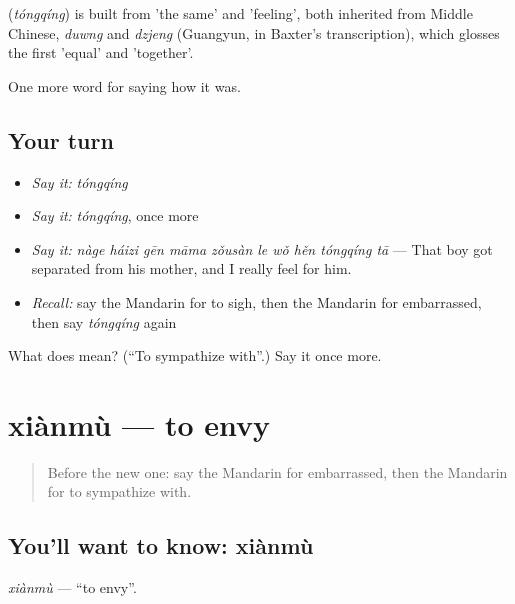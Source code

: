 \begin{cousinweb}
\textbf{} (\emph{tóngqíng}) is built from  'the same' and  'feeling', both inherited from Middle Chinese, \emph{duwng} and \emph{dzjeng} (Guangyun, in Baxter's transcription), which glosses the first 'equal' and 'together'.
\end{cousinweb}

\begin{grammarlens}[title={What you've built}]
One more word for saying how it was.
\end{grammarlens}

\subsection*{Your turn}
\begin{itemize}
\raggedright
  \item \emph{Say it:} \emph{tóngqíng}
  \item \emph{Say it:} \emph{tóngqíng}, once more
  \item \emph{Say it:} \emph{nàge háizi gēn māma zǒusàn le wǒ hěn tóngqíng tā} — That boy got separated from his mother, and I really feel for him.
  \item \emph{Recall:} say the Mandarin for to sigh, then the Mandarin for embarrassed, then say \emph{tóngqíng} again
\end{itemize}

\begin{tcolorbox}[breakable,colback=teal!4,colframe=teal!35!black,title={Before you move on}]
What does  mean? (\textquotedblleft{}To sympathize with\textquotedblright{}.) Say it once more.
\end{tcolorbox}
\section[xiànmù]{xiànmù — to envy}

\label{lesson:ZH-C460-xianmu}



\begin{quote}
Before the new one: say the Mandarin for embarrassed, then the Mandarin for to sympathize with.
\end{quote}

\subsection*{You'll want to know: xiànmù}
\emph{xiànmù} — \textquotedblleft{}to envy\textquotedblright{}.

